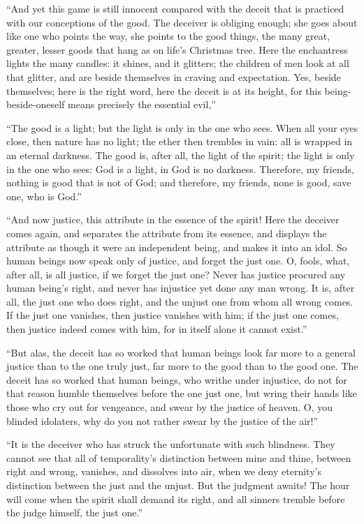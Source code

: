 \documentclass[12pt,a4paper]{book}
\begin{document}
``And yet this game is still innocent compared with the deceit that is practiced with our conceptions of the good. The deceiver is obliging enough; she goes about like one who points the way, she points to the good things, the many great, greater, lesser goods that hang as on life's Christmas tree. Here the enchantress lights the many candles: it shines, and it glitters; the children of men look at all that glitter, and are beside themselves in craving and expectation. Yes, beside themselves; here is the right word, here the deceit is at its height, for this being-beside-oneself means precisely the essential evil,''

``The good is a light; but the light is only in the one who sees. When all your eyes close, then nature has no light; the ether then trembles in vain: all is wrapped in an eternal darkness. The good is, after all, the light of the spirit; the light is only in the one who sees: God is a light, in God is no darkness. Therefore, my friends,
nothing is good that is not of God; and therefore, my friends, none is good, save one, who is God.''

``And now justice, this attribute in the essence of the spirit! Here the deceiver comes again, and separates the attribute from its essence, and displays the attribute as though it were an independent being, and makes it into an idol. So human beings now speak only of justice, and forget the just one. O, fools, what, after all, is all justice, if we forget the just one? Never has justice procured any human being's right, and never has injustice yet done any man wrong. It is, after all, the just one who does right, and the unjust one from whom all wrong comes. If the just one vanishes, then justice vanishes with him; if the just one comes, then justice indeed comes with him, for in itself alone it cannot exist.''

``But alas, the deceit has so worked that human beings look far more to a general justice than to the one truly just, far more to the good than to the good one. The deceit has so worked that human beings, who writhe under injustice, do not for that reason humble themselves before the one just one, but wring their hands like those who cry out for vengeance, and swear by the justice of heaven. O, you blinded idolaters, why do you not rather swear by the justice of the air!''

``It is the deceiver who has struck the unfortunate with such blindness. They cannot see that all of temporality's distinction between mine and thine, between right and wrong, vanishes, and dissolves into air, when we deny eternity's distinction between the just and the unjust. But the judgment awaits! The hour will come when the spirit shall demand its right, and all sinners tremble before the judge himself, the just one.''
\end{document}
